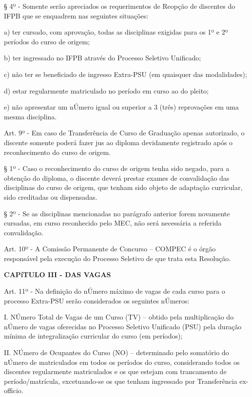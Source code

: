 	§ 4º - Somente serão apreciados os requerimentos de Reopção de discentes do IFPB que se enquadrem nas seguintes situações:

	a) ter cursado, com aprovação, todas as disciplinas exigidas para os 1º e 2º períodos do curso de origem;

	b) ter ingressado no IFPB através do Processo Seletivo Unificado;

	c) não ter se beneficiado de ingresso Extra-PSU (em quaisquer das modalidades);

	d) estar regularmente matriculado no período em curso ao do pleito;

	e) não apresentar um nÚmero igual ou superior a 3 (três) reprovações em uma mesma disciplina.

\vspace{1mm}
Art. 9º - Em caso de Transferência de Curso de Graduação apenas autorizado, o discente somente poderá fazer jus ao diploma devidamente registrado após o reconhecimento do curso de origem.

§ 1º - Caso o reconhecimento do curso de origem tenha sido negado, para a obtenção do diploma, o discente deverá prestar exames de convalidação das disciplinas do curso de origem, que tenham sido objeto de adaptação curricular, sido creditadas ou dispensadas.

§ 2º - Se as disciplinas mencionadas no parágrafo anterior forem novamente cursadas, em curso reconhecido pelo MEC, não será necessária a referida convalidação.

\vspace{1mm}
Art. 10º - A Comissão Permanente de Concurso – COMPEC é o órgão responsável pela execução do Processo Seletivo de que trata esta Resolução.


\vspace{4mm}
\textbf{CAPíTULO III - DAS VAGAS}
\vspace{4mm}


\vspace{1mm}
Art. 11º - Na definição do nÚmero máximo de vagas de cada curso para o processo Extra-PSU serão considerados os seguintes nÚmeros:


I. NÚmero Total de Vagas de um Curso (TV) – obtido pela multiplicação do nÚmero de vagas oferecidas no Processo Seletivo Unificado (PSU) pela duração mínima de integralização curricular do curso (em períodos);

II. NÚmero de Ocupantes do Curso (NO) – determinado pelo somatório do nÚmero de matriculados em todos os períodos do curso, considerando todos os discentes regularmente matriculados e os que estejam com trancamento de período/matrícula, excetuando-se os que tenham ingressado por Transferência ex-officio.

